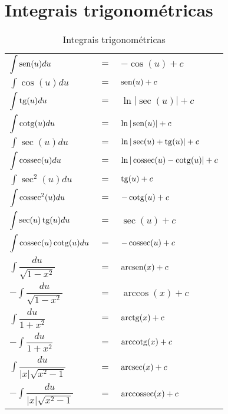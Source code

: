 \section{Integrais trigonométricas}
	\begin{table}[htb]
		\caption{Integrais trigonométricas}
		\label{integrais_trigonometricas}
		\centering
		\begin{tabular}{|lcl|}
			$\displaystyle\int \operatorname{sen}(u)du$                      & $=$ & $-\cos(u) + c$                   \\
			$\displaystyle\int \cos(u)du$                      & $=$ & $\operatorname{sen}(u) + c$                    \\
			$\displaystyle\int \operatorname{tg}(u)du$                       & $=$ & $\ln|\sec(u)| + c$               \\
			$\displaystyle\int \operatorname{cotg}(u)du$                     & $=$ & $\ln|\operatorname{sen}(u)| + c$               \\
			$\displaystyle\int \sec(u)du$                      & $=$ & $\ln|\sec(u) + \operatorname{tg}(u)| + c$      \\
			$\displaystyle\int \operatorname{cossec}(u)du$                   & $=$ & $\ln|\operatorname{cossec}(u) - \operatorname{cotg}(u)| + c$ \\
			$\displaystyle\int \sec^2(u)du$                    & $=$ & $\operatorname{tg}(u) + c$                     \\
			$\displaystyle\int \operatorname{cossec}^2(u)du$                 & $=$ & $-\operatorname{cotg}(u) + c$                  \\
			$\displaystyle\int \sec(u)\operatorname{tg}(u)du$                & $=$ & $\sec(u) + c$                    \\
			$\displaystyle\int \operatorname{cossec}(u)\operatorname{cotg}(u)du$           & $=$ & $-\operatorname{cossec}(u) + c$                \\
			$\displaystyle\int \dfrac{du}{\sqrt{1 - x^2}}$     & $=$ & $\operatorname{arcsen}(x) + c$                 \\
			$-\displaystyle\int \dfrac{du}{\sqrt{1 - x^2}}$    & $=$ & $\arccos(x) + c$                 \\
			$\displaystyle\int \dfrac{du}{1 + x^2}$            & $=$ & $\operatorname{arctg}(x) + c$                  \\
			$-\displaystyle\int \dfrac{du}{1 + x^2}$           & $=$ & $\operatorname{arccotg}(x) + c$                \\
			$\displaystyle\int \dfrac{du}{|x|\sqrt{x^2 - 1}}$  & $=$ & $\operatorname{arcsec}(x) + c$                 \\
			$-\displaystyle\int \dfrac{du}{|x|\sqrt{x^2 - 1}}$ & $=$ & $\operatorname{arccossec}(x) + c$
		\end{tabular}		
	\end{table}

